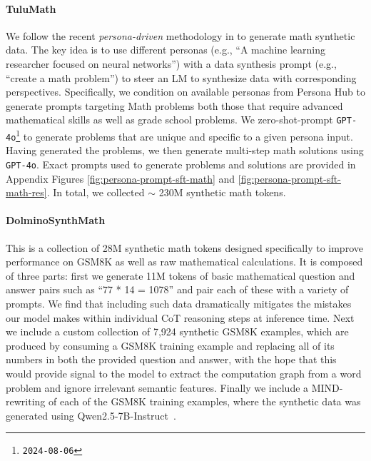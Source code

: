 \documentclass[table]{ai2style/ai2}
\begin{document}
\paragraph{TuluMath} We follow the recent \textit{persona-driven} methodology in \citet{chan2024scaling} to generate math synthetic data. The key idea is to use different personas (e.g., ``A machine learning researcher focused on neural networks'') with a data synthesis prompt (e.g., ``create a math problem'') to steer an LM to synthesize data with corresponding perspectives. 
Specifically, we condition on available personas from Persona Hub \citep{chan2024scaling} to generate prompts targeting Math problems both those that require advanced mathematical skills as well as grade school problems. We zero-shot-prompt  \texttt{GPT-4o}\footnote{\texttt{2024-08-06}} to generate problems that are unique and specific to a given persona input. 
Having generated the problems, we then generate multi-step math solutions using \texttt{GPT-4o}. Exact prompts used to generate problems and solutions are provided in Appendix Figures \ref{fig:persona-prompt-sft-math} and \ref{fig:persona-prompt-sft-math-res}. In total, we collected $\sim$ 230M synthetic math tokens.

\paragraph{DolminoSynthMath} This is a collection of 28M synthetic math tokens designed specifically to improve performance on GSM8K as well as raw mathematical calculations. It is composed of three parts: first we generate 11M tokens of basic mathematical question and answer pairs such as ``77 * 14 = 1078'' and pair each of these with a variety of prompts. We find that including such data dramatically mitigates the mistakes our model makes within individual CoT reasoning steps at inference time. Next we include a custom collection of 7,924 synthetic GSM8K examples, which are produced by consuming a GSM8K training example and replacing all of its numbers in both the provided question and answer, with the hope that this would provide signal to the model to extract the computation graph from a word problem and ignore irrelevant semantic features. Finally we include a MIND-rewriting \citep{akter2024mindmathinformedsynthetic} of each of the GSM8K training examples, where the synthetic data was generated using Qwen2.5-7B-Instruct~\citep{qwen2.5}.
\end{document}
